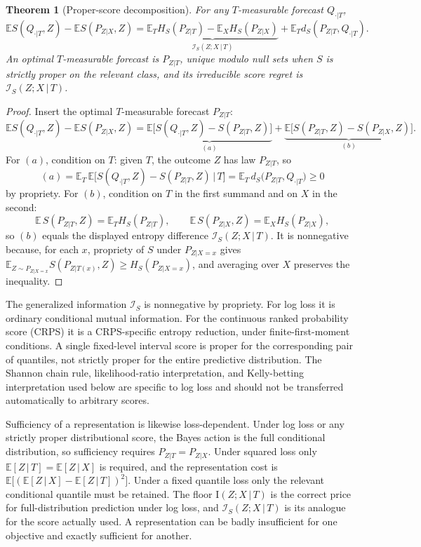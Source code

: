 \documentclass[11pt]{article}
\newtheorem{theorem}{Theorem}
\theoremstyle{remark}
\newcommand{\E}{\mathbb{E}}
\newcommand{\I}{\mathrm{I}}
\newcommand{\given}{\,|\,}
\begin{document}
\begin{theorem}[Proper-score decomposition]\label{thm:proper}
For any $T$-measurable forecast $Q_{\cdot|T}$,
\begin{equation}\label{eq:properdecomp}
\E S(Q_{\cdot|T},Z)-\E S(P_{Z|X},Z)
=\underbrace{\E_T H_S(P_{Z|T})-\E_X H_S(P_{Z|X})}_{\mathcal I_S(Z;X\given T)}
+\E_T d_S(P_{Z|T},Q_{\cdot|T}).
\end{equation}
An optimal $T$-measurable forecast is $P_{Z|T}$, unique modulo null sets when $S$ is
strictly proper on the relevant class, and its irreducible score regret is
$\mathcal I_S(Z;X\given T)$.
\end{theorem}

\begin{proof}
Insert the optimal $T$-measurable forecast $P_{Z|T}$:
\[
\E S(Q_{\cdot|T},Z)-\E S(P_{Z|X},Z)
=\underbrace{\E\big[S(Q_{\cdot|T},Z)-S(P_{Z|T},Z)\big]}_{(a)}
+\underbrace{\E\big[S(P_{Z|T},Z)-S(P_{Z|X},Z)\big]}_{(b)}.
\]
For $(a)$, condition on $T$: given $T$, the outcome $Z$ has law $P_{Z|T}$, so
\[
(a)=\E_T\,\E\big[S(Q_{\cdot|T},Z)-S(P_{Z|T},Z)\,\big|\,T\big]
=\E_T\,d_S\big(P_{Z|T},Q_{\cdot|T}\big)\ge0
\]
by propriety. For $(b)$, condition on $T$ in the first summand and on $X$ in the second:
\[
\E\,S(P_{Z|T},Z)=\E_T H_S(P_{Z|T}),\qquad
\E\,S(P_{Z|X},Z)=\E_X H_S(P_{Z|X}),
\]
so $(b)$ equals the displayed entropy difference $\mathcal I_S(Z;X\given T)$. It is
nonnegative because, for each $x$, propriety of $S$ under $P_{Z|X=x}$ gives
$\E_{Z\sim P_{Z|X=x}}S(P_{Z|T(x)},Z)\ge H_S(P_{Z|X=x})$, and averaging over $X$ preserves
the inequality.
\end{proof}

The generalized information $\mathcal I_S$ is nonnegative by propriety. For log loss it is
ordinary conditional mutual information. For the continuous ranked probability score (CRPS) it is a CRPS-specific entropy reduction,
under finite-first-moment conditions. A single fixed-level interval score is proper for the
corresponding pair of quantiles, not strictly proper for the entire predictive distribution. The
Shannon chain rule, likelihood-ratio interpretation, and Kelly-betting interpretation used below
are specific to log loss and should not be transferred automatically to arbitrary scores.

Sufficiency of a representation is likewise loss-dependent. Under log loss or any strictly
proper distributional score, the Bayes action is the full conditional distribution, so
sufficiency requires $P_{Z|T}=P_{Z|X}$. Under squared loss only $\E[Z\given T]=\E[Z\given X]$ is required, and the representation
cost is $\E\big[(\E[Z\given X]-\E[Z\given T])^2\big]$. Under a fixed quantile loss only
the relevant conditional quantile must be retained. The floor $\I(Z;X\given T)$ is the
correct price for full-distribution prediction under log loss, and
$\mathcal I_S(Z;X\given T)$ is its analogue for the score actually used. A representation
can be badly insufficient for one objective and exactly sufficient for another.
\end{document}
